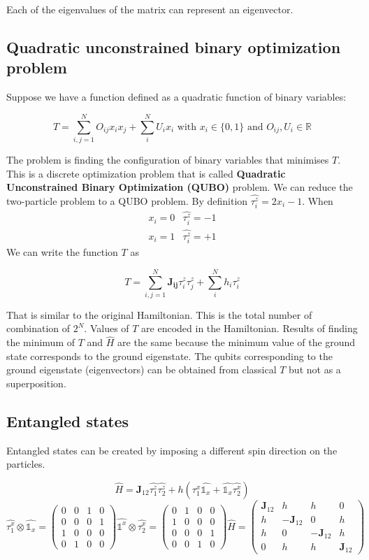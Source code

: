 	Each of the eigenvalues of the matrix can represent an eigenvector.

	\subsection{Quadratic unconstrained binary optimization problem}
	Suppose we have a function defined as a quadratic function of binary variables:

	$$T=\sum_{i,j=1}^N O_{ij}x_ix_j+\sum_i^N U_ix_i \text{ with } x_i\in \{0,1\} \text{ and } O_{ij},U_i\in \mathbb{R}$$

	The problem is finding the configuration of binary variables that minimises $T$.
	This is a discrete optimization problem that is called \textbf{Quadratic Unconstrained Binary Optimization (QUBO)} problem.
	We can reduce the two-particle problem to a QUBO problem.
	By definition $\hat{\tau_i^z}=2x_i-1$.
	When \[\begin{matrix}x_i=0&\hat{\tau_i^z}=-1\\x_i=1&\hat{\tau_i^z}=+1 \end{matrix}\]
	We can write the function $T$ as

	$$T=\sum_{i,j=1}^N \mathbf{J_{ij}}\tau_i^z\tau_j^z+\sum_i^N h_i\tau_i^z$$

	That is similar to the original Hamiltonian.
	This is the total number of combination of $2^N$.
	Values of $T$ are encoded in the Hamiltonian.
	Results of finding the minimum of $T$ and $\hat{H}$ are the same because the minimum value of the ground state corresponds to the ground eigenstate.
	The qubits corresponding to the ground eigenstate (eigenvectors) can be obtained from classical $T$ but not as a superposition.

	\subsection{Entangled states}
	Entangled states can be created by imposing a different spin direction on the particles.

	$$\hat{H}=\mathbf{J}_{12}\hat{\tau_1^z}\hat{\tau_2^z}+h(\hat{\tau_1^x}\hat{\mathbb{1}_x}+\hat{\mathbb{1}_x}\hat{\tau_2^x})$$
	$$\hat{\tau_1^x}\otimes\hat{\mathbb{1}_x}=\begin{pmatrix}0&0&1&0\\0&0&0&1\\1&0&0&0\\0&1&0&0\end{pmatrix}\hat{\mathbb{1}^x}\otimes\hat{\tau_2^x}=\begin{pmatrix}0&1&0&0\\1&0&0&0\\0&0&0&1\\0&0&1&0\end{pmatrix}\hat{H}=\begin{pmatrix}\mathbf{J}_{12}&h&h&0\\h&-\mathbf{J}_{12}&0&h\\h&0&-\mathbf{J}_{12}&h\\0&h&h&\mathbf{J}_{12}\end{pmatrix}$$


